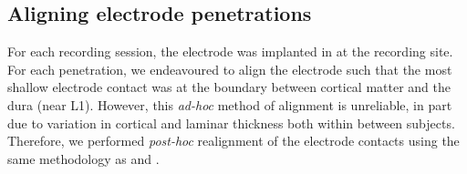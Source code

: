 %
%
%
%


\subsection{Aligning electrode penetrations}
\label{sec:lam_align}

For each recording session, the electrode was implanted in  at the recording site.
For each penetration, we endeavoured to align the electrode such that the most shallow electrode contact was at the boundary between cortical matter and the dura (near \ac{L1}).
However, this \textit{ad-hoc} method of alignment is unreliable, in part due to variation in cortical and laminar thickness both within between subjects.
Therefore, we performed \textit{post-hoc} realignment of the electrode contacts using the same methodology as \citet{Self2013} and \citet{VanKerkoerle2014}.

